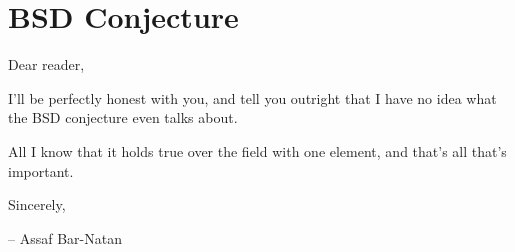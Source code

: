 \setlength\parindent{12pt}

\setcounter{section}{0}

\section{BSD Conjecture}
Dear reader,

I'll be perfectly honest with you, and tell you outright that I have
no idea what the BSD conjecture even talks about.

All I know that it holds true over the field with one element, and
that's all that's important.

Sincerely,\\
\begin{flushright}
  -- Assaf Bar-Natan
\end{flushright}
\setlength\parindent{0pt}
